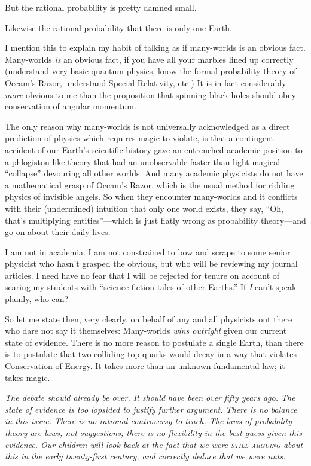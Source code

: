 {
 But the rational probability is pretty damned small.}

{
 Likewise the rational probability that there is only one Earth.}

{
 I mention this to explain my habit of talking as if many-worlds is
an obvious fact. Many-worlds \textit{is} an obvious fact, if you have
all your marbles lined up correctly (understand very basic quantum
physics, know the formal probability theory of Occam's
Razor, understand Special Relativity, etc.) It is in fact considerably
\textit{more} obvious to me than the proposition that spinning black
holes should obey conservation of angular momentum.}

{
 The only reason why many-worlds is not universally acknowledged as
a direct prediction of physics which requires magic to violate, is that
a contingent accident of our Earth's scientific history
gave an entrenched academic position to a phlogiston-like theory that
had an unobservable faster-than-light magical
``collapse'' devouring all other
worlds. And many academic physicists do not have a mathematical grasp
of Occam's Razor, which is the usual method for ridding
physics of invisible angels. So when they encounter many-worlds and it
conflicts with their (undermined) intuition that only one world exists,
they say, ``Oh, that's multiplying
entities''---which is just flatly wrong as
probability theory---and go on about their daily lives.}

{
 I am not in academia. I am not constrained to bow and scrape to
some senior physicist who hasn't grasped the obvious,
but who will be reviewing my journal articles. I need have no fear that
I will be rejected for tenure on account of scaring my students with
``science-fiction tales of other
Earths.'' If \textit{I} can't speak
plainly, who can?}

{
 So let me state then, very clearly, on behalf of any and all
physicists out there who dare not say it themselves: Many-worlds
\textit{wins outright} given our current state of evidence. There is no
more reason to postulate a single Earth, than there is to postulate
that two colliding top quarks would decay in a way that violates
Conservation of Energy. It takes more than an unknown fundamental law;
it takes magic.}

{
 \textit{The debate should already be over. It should have been
over fifty years ago. The state of evidence is too lopsided to justify
further argument. There is no balance in this issue. There is no
rational controversy to teach. The laws of probability theory are laws,
not suggestions; there is no flexibility in the best guess given this
evidence. Our children will look back at the fact that we were \textsc{still
arguing} about this in the early twenty-first century, and correctly
deduce that we were nuts.}}

